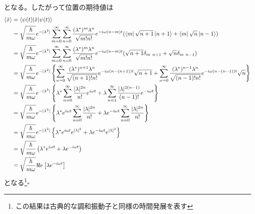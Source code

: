\documentclass{jsarticle}  %
\numberwithin{equation}{section} %
\numberwithin{figure}{section}
\begin{document}
    となる。したがって位置の期待値は
    \begin{align}
        \braket{\hat{x}} &= \braket{\psi(t)|\hat{x}|\psi (t)} \notag \\
        &= \sqrt{\frac{\hbar}{m\omega}} e^{-|\lambda^2|} \sum_{m=0}^{\infty}\sum_{n=0}^{\infty} \frac{(\lambda^*)^m\lambda^n}{\sqrt{m!n!}}e^{-i\omega(n-m)t}(\bra{m}\sqrt{n+1}\ket{n+1} + \bra{m}\sqrt{n}\ket{n-1}) \notag \\
        &= \sqrt{\frac{\hbar}{m\omega}} e^{-|\lambda^2|} \sum_{m=0}^{\infty}\sum_{n=0}^{\infty} \frac{(\lambda^*)^m\lambda^n}{\sqrt{m!n!}}e^{-i\omega(n-m)t}(\sqrt{n+1} \delta_{m\ n+1} + \sqrt{n}\delta_{m\ n-1})  \notag \\
        &= \sqrt{\frac{\hbar}{m\omega}} e^{-|\lambda^2|} \left\{ \sum_{n=0}^{\infty} \frac{(\lambda^*)^{n+1}\lambda^n}{\sqrt{(n+1)!n!}}e^{-i\omega(n-(n+1))t}\sqrt{n+1} + \sum_{n=0}^{\infty} \frac{(\lambda^*)^{n-1}\lambda^n}{\sqrt{(n-1)!n!}}e^{-i\omega(n-(n-1))t}\sqrt{n} \right\} \notag \\
        &= \sqrt{\frac{\hbar}{m\omega}} e^{-|\lambda^2|} \left\{ \lambda^* \sum_{n=0}^{\infty} \frac{|\lambda|^{2n}}{n!}e^{i\omega t} + \lambda \sum_{n=1}^{\infty} \frac{|\lambda|^{2({n-1})}}{(n-1)!}e^{-i\omega t} \right\} \notag \\
        &= \sqrt{\frac{\hbar}{m\omega}} e^{-|\lambda^2|} \left\{ \lambda^* e^{i\omega t}\sum_{n=0}^{\infty} \frac{|\lambda|^{2n}}{n!} + \lambda e^{-i\omega t}\sum_{n=0}^{\infty} \frac{|\lambda|^{2n}}{n!} \right\} \notag \\
        &= \sqrt{\frac{\hbar}{m\omega}} e^{-|\lambda^2|} \left\{ \lambda^* e^{i\omega t} e^{|\lambda|^2} + \lambda e^{-i\omega t}e^{|\lambda|^2} \right\} \notag \\
        &= \sqrt{\frac{\hbar}{m\omega}} \left( \lambda^* e^{i\omega t} + \lambda e^{-i\omega t} \right) \notag \\
        &= \sqrt{\frac{\hbar}{m\omega}} \Re e\left[ \lambda e^{-i\omega t} \right]
    \end{align}
    となる\footnote{この結果は古典的な調和振動子と同様の時間発展を表す}$\square$
\end{document}
